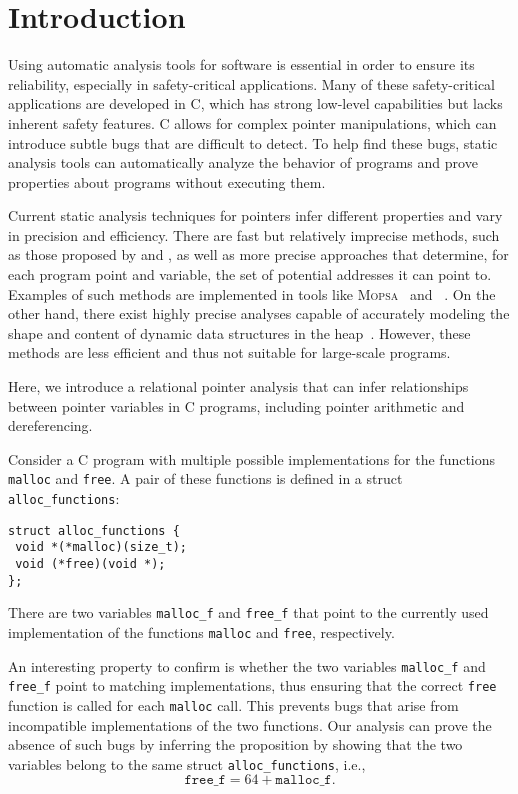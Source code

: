 
\chapter{Introduction}\label{chapter:introduction}

Using automatic analysis tools for software is essential in order to ensure its reliability, especially in safety-critical applications.
Many of these safety-critical applications are developed in C, which has strong low-level capabilities but lacks inherent safety features.
C allows for complex pointer manipulations, which can introduce subtle bugs that are difficult to detect.
To help find these bugs, static analysis tools can automatically analyze the behavior of programs and prove properties about programs without executing them.

Current static analysis techniques for pointers infer different properties and vary in precision and efficiency.
There are fast but relatively imprecise methods, such as those proposed by \textcite{Steensgaard} and \textcite{Andersen}, as well as more precise approaches that determine, for each program point and variable, the set of potential addresses it can point to.
Examples of such methods are implemented in tools like \textsc{Mopsa}~\cite{mopsa} and \goblint~\cite{goblint}.
On the other hand, there exist highly precise analyses capable of accurately modeling the shape and content of dynamic data structures in the heap~\cite{rivalpapers,kreiker,predator}.
However, these methods are less efficient and thus not suitable for large-scale programs.

Here, we introduce a relational pointer analysis that can infer relationships between pointer variables in C programs, including pointer arithmetic and dereferencing.
\begin{example}
    Consider a C program with multiple possible implementations for the functions \texttt{malloc} and \texttt{free}.
    A pair of these functions is defined in a struct \texttt{alloc\_functions}:
\begin{verbatim}
struct alloc_functions {
 void *(*malloc)(size_t);
 void (*free)(void *);
};
\end{verbatim}
    There are two variables \texttt{malloc\_f} and \texttt{free\_f} that point to the currently used implementation of the functions \texttt{malloc} and \texttt{free}, respectively.

    An interesting property to confirm is whether the two variables \texttt{malloc\_f} and \texttt{free\_f} point to matching implementations, thus ensuring that the correct \texttt{free} function is called for each \texttt{malloc} call.
    This prevents bugs that arise from incompatible implementations of the two functions.
    Our analysis can prove the absence of such bugs by inferring the proposition by showing that the two variables belong to the same struct \texttt{alloc\_functions}, i.e.,
    \[
        \texttt{free\_f} = 64 + \texttt{malloc\_f}.
    \]
\end{example}

